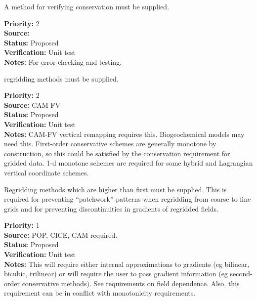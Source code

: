 A method for verifying conservation must be supplied.

\begin{reqlist}
{\bf Priority:} 2 \\
{\bf Source:} \\
{\bf Status:} Proposed \\
{\bf Verification:} Unit test \\
{\bf Notes:} For error checking and testing.
\end{reqlist}


 regridding methods must be supplied.

\begin{reqlist}
{\bf Priority:} 2 \\
{\bf Source:} CAM-FV \\
{\bf Status:} Proposed \\
{\bf Verification:} Unit test \\
{\bf Notes:} CAM-FV vertical remapping requires this.
	     Biogeochemical models may need this.  First-order
             conservative schemes are generally monotone by
             construction, so this could be satisfied by the
             conservation requirement for gridded data.
             1-d monotone schemes are required for some hybrid
             and Lagrangian vertical coordinate schemes.
\end{reqlist}



Regridding methods which are higher than first 
must be supplied.  This is required for preventing
``patchwork'' patterns when regridding from coarse to fine
grids and for preventing discontinuities in gradients of
regridded fields.

\begin{reqlist}
{\bf Priority:} 1 \\
{\bf Source:}  POP, CICE, CAM required. \\
{\bf Status:} Proposed \\
{\bf Verification:} Unit test \\
{\bf Notes:} This will require either internal approximations to
             gradients (eg bilinear, bicubic, trilinear) or will require the
             user to pass gradient information (eg second-order conservative
             methods).  See requirements on field dependence.  Also, this
             requirement can be in conflict with monotonicity requirements.
\end{reqlist}

